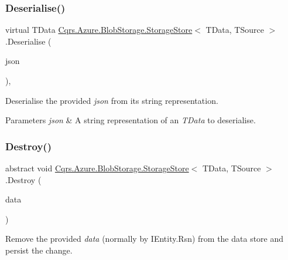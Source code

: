 \subsubsection{\texorpdfstring{Deserialise()}{Deserialise()}\hspace{0.1cm}{\footnotesize\ttfamily [2/2]}}
{\footnotesize\ttfamily virtual T\+Data \hyperlink{classCqrs_1_1Azure_1_1BlobStorage_1_1StorageStore}{Cqrs.\+Azure.\+Blob\+Storage.\+Storage\+Store}$<$ T\+Data, T\+Source $>$.Deserialise (\begin{DoxyParamCaption}\item[{string}]{json }\end{DoxyParamCaption})\hspace{0.3cm}{\ttfamily [protected]}, {\ttfamily [virtual]}}



Deserialise the provided {\itshape json}  from its string representation. 


\begin{DoxyParams}{Parameters}
{\em json} & A string representation of an {\itshape T\+Data}  to deserialise.\\
\hline
\end{DoxyParams}
\mbox{\label{classCqrs_1_1Azure_1_1BlobStorage_1_1StorageStore_a9879b4ab18c2a33d7e20bc0b3a734195_a9879b4ab18c2a33d7e20bc0b3a734195}} 
\subsubsection{\texorpdfstring{Destroy()}{Destroy()}}
{\footnotesize\ttfamily abstract void \hyperlink{classCqrs_1_1Azure_1_1BlobStorage_1_1StorageStore}{Cqrs.\+Azure.\+Blob\+Storage.\+Storage\+Store}$<$ T\+Data, T\+Source $>$.Destroy (\begin{DoxyParamCaption}\item[{T\+Data}]{data }\end{DoxyParamCaption})\hspace{0.3cm}{\ttfamily [pure virtual]}}



Remove the provided {\itshape data}  (normally by I\+Entity.\+Rsn) from the data store and persist the change. 



